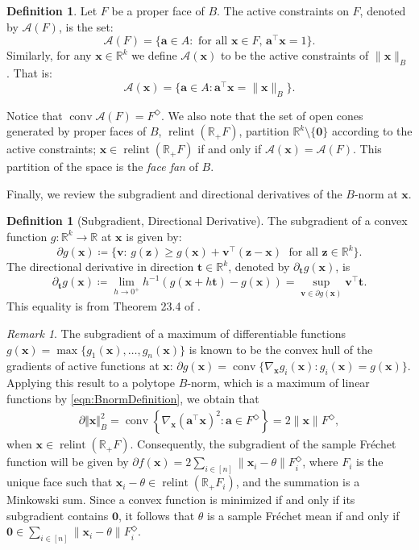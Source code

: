 \documentclass[10pt]{article}
\theoremstyle{definition}
\newtheorem{definition}[theorem]{Definition}
\theoremstyle{remark}
\newtheorem{remark}[theorem]{Remark}
\newcommand{\R}{\mathbb{R}}
\newcommand{\T}{\intercal}
\DeclareMathOperator{\conv}{conv}
\DeclareMathOperator{\relint}{relint}
\renewcommand{\vec}[1]{\mathbf{#1}}
\newcommand{\A}{\mathcal{A}}
\begin{document}
	\begin{definition}
		Let $F$ be a proper face of $B$. The active constraints on $F$, denoted by $\A(F)$, is the set:
		\[
		\A(F) = \{ \vec a \in A : \text{ for all } \vec x \in F, \,  \vec a^{\T} \vec x=1 \}. 
		\]
		Similarly, for any $\vec x \in \R^k$ we define $\A(\vec x)$ to be the active constraints of $\| \vec x \|_B$. That is:
		\[
		\A( \vec x ) = \{ \vec a \in A :  \vec a^{\T} \vec x = \| \vec x \|_B \}.
		\]
	\end{definition}
	Notice that $\conv \A(F) = F^{\Diamond}$. We also note that the set of open cones generated by proper faces of $B$, $\relint (\R_+ F)$, partition $\R^k \setminus \{ \vec 0 \}$ according to the active constraints; $\vec x \in \relint (\R_+ F)$ if and only if $\A(\vec x) = \A(F)$.  This partition of the space is the \emph{face fan} of $B$.
	
	Finally, we review the subgradient and directional derivatives of the $B$-norm at $\vec x$. 
	
	\begin{definition}[Subgradient, Directional Derivative]
		The subgradient of a convex function $g:\R^k \rightarrow \R$ at $\vec x$ is given by:
		\[
		\partial g(\vec x) \coloneqq \{ \vec v : \, g(\vec z) \geq g(\vec x) + \vec v^{\T}(\vec z-\vec x) \; \text{ for all } \vec z \in \R^k \}.
		\]
		The directional derivative in direction $\vec t \in \R^k$, denoted by $\partial_{\vec t} g(\vec x)$, is 
		\[
		\partial_{\vec t} g(\vec x) \coloneqq \lim_{h \rightarrow 0^+} h^{-1} \left( g(\vec x + h \vec t) - g(\vec x) \right) = \sup_{\vec v \in \partial g(\vec x)} \vec v^{\T} \vec t.
		\]
		This equality is from Theorem 23.4 of \citep{rockafellar1970convex}.
	\end{definition}
	
	
	\begin{remark}
		\label{rmk:subgradient}
		The subgradient of a maximum of differentiable functions $g(\vec x) = \max \{ g_1(\vec x), \dots, g_n(\vec x)\}$ is known to be the convex hull of the gradients of active functions at $\vec x$: $\partial g(\vec x) = \conv \{ \nabla_{\vec x} g_i(\vec x):g_i(\vec x) = g(\vec x)\}$. Applying this result to a polytope $B$-norm, which is a maximum of linear functions by \eqref{eqn:BnormDefinition}, we obtain that
		\begin{align*}
			\partial \Vert \vec x \Vert_B^2 =  \conv \left \{ \nabla_{\vec x} (\vec a^{\top}\vec x)^2: \vec a \in F^{\Diamond} \right\} = 2\| \vec x \| F^{\Diamond}, 
		\end{align*}
		when $\vec x \in \relint (\R_+ F)$. Consequently, the subgradient of the sample Fr\'echet function will be given by
		$\partial f(\vec x) =   2\sum_{i \in [n]} \| \vec x_i - \theta \| F_i^{\Diamond}$, where $F_i$ is the unique face such that $\vec x_i - \theta \in \relint (\R_+ F_i)$, and the summation is a Minkowski sum. Since a convex function is minimized if and only if its subgradient contains $\vec 0$, it follows that $\theta$ is a sample Fr\'echet mean if and only if $\vec 0 \in  \sum_{i \in [n]} \| \vec x_i - \theta \| F_i^{\Diamond}$.  
	\end{remark}
	
\end{document}
